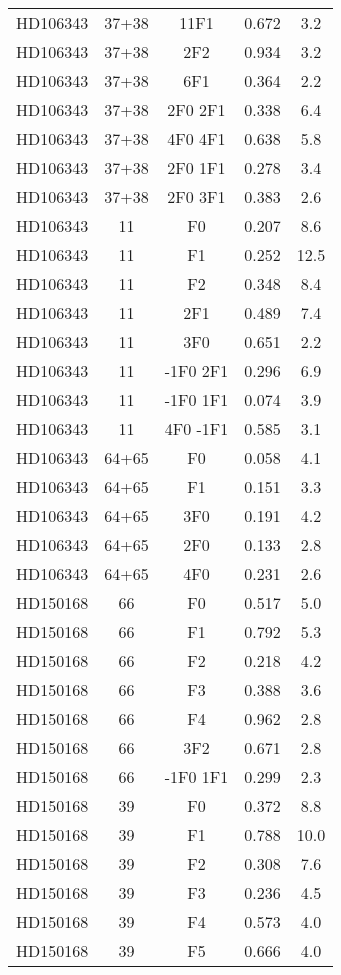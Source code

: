 \begin{table*}
\begin{tabular}{l c c c c}
HD106343 & 37+38 & 11F1 & 0.672 & 3.2\\ 
HD106343 & 37+38 & 2F2 & 0.934 & 3.2\\ 
HD106343 & 37+38 & 6F1 & 0.364 & 2.2\\ 
HD106343 & 37+38 & 2F0 2F1 & 0.338 & 6.4\\ 
HD106343 & 37+38 & 4F0 4F1 & 0.638 & 5.8\\ 
HD106343 & 37+38 & 2F0 1F1 & 0.278 & 3.4\\ 
HD106343 & 37+38 & 2F0 3F1 & 0.383 & 2.6\\ 
\hline
HD106343 & 11 & F0 & 0.207 & 8.6\\ 
HD106343 & 11 & F1 & 0.252 & 12.5\\ 
HD106343 & 11 & F2 & 0.348 & 8.4\\ 
HD106343 & 11 & 2F1 & 0.489 & 7.4\\ 
HD106343 & 11 & 3F0 & 0.651 & 2.2\\ 
HD106343 & 11 & -1F0 2F1 & 0.296 & 6.9\\ 
HD106343 & 11 & -1F0 1F1 & 0.074 & 3.9\\ 
HD106343 & 11 & 4F0 -1F1 & 0.585 & 3.1\\ 
\hline
HD106343 & 64+65 & F0 & 0.058 & 4.1\\ 
HD106343 & 64+65 & F1 & 0.151 & 3.3\\ 
HD106343 & 64+65 & 3F0 & 0.191 & 4.2\\ 
HD106343 & 64+65 & 2F0 & 0.133 & 2.8\\ 
HD106343 & 64+65 & 4F0 & 0.231 & 2.6\\ 
\hline
HD150168 & 66 & F0 & 0.517 & 5.0\\ 
HD150168 & 66 & F1 & 0.792 & 5.3\\ 
HD150168 & 66 & F2 & 0.218 & 4.2\\ 
HD150168 & 66 & F3 & 0.388 & 3.6\\ 
HD150168 & 66 & F4 & 0.962 & 2.8\\ 
HD150168 & 66 & 3F2 & 0.671 & 2.8\\ 
HD150168 & 66 & -1F0 1F1 & 0.299 & 2.3\\ 
\hline
HD150168 & 39 & F0 & 0.372 & 8.8\\ 
HD150168 & 39 & F1 & 0.788 & 10.0\\ 
HD150168 & 39 & F2 & 0.308 & 7.6\\ 
HD150168 & 39 & F3 & 0.236 & 4.5\\ 
HD150168 & 39 & F4 & 0.573 & 4.0\\ 
HD150168 & 39 & F5 & 0.666 & 4.0\\ 

\end{tabular}
\end{table*}

